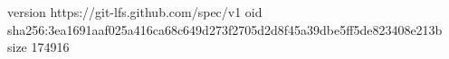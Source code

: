 version https://git-lfs.github.com/spec/v1
oid sha256:3ea1691aaf025a416ca68c649d273f2705d2d8f45a39dbe5ff5de823408e213b
size 174916
